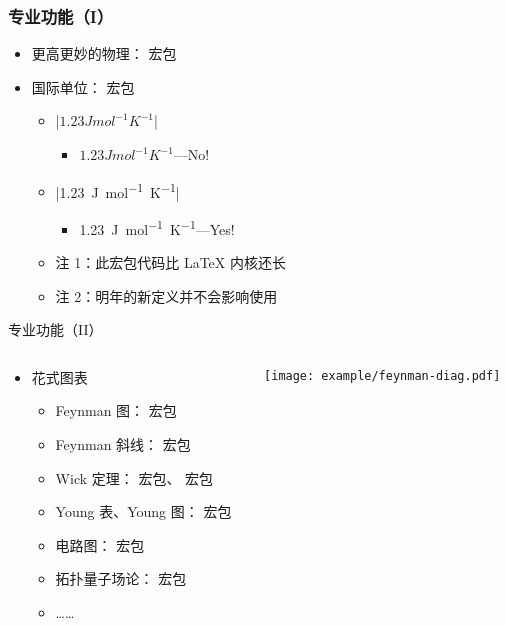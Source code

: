 \begin{frame}[fragile]
\frametitle{专业功能（I）}
\begin{itemize}
  \item 更高更妙的物理： 宏包
  \item 国际单位： 宏包
    \begin{itemize}
      \item |$1.23 J mol^{-1} K^{-1}$|
        \begin{itemize}
          \item $1.23 J mol^{-1} K^{-1}$---No!
        \end{itemize}
      \item |\SI{1.23}{J.mol^{-1}.K^{-1}}| 
        \begin{itemize}
          \item \SI{1.23}{J.mol^{-1}.K^{-1}}---Yes!
        \end{itemize}
      \item 注 1：此宏包代码比 \LaTeX{} 内核还长
      \item 注 2：明年的新定义并不会影响使用
    \end{itemize}
\end{itemize}
\end{frame}

\begin{frame}{专业功能（II）}
\begin{columns}
\begin{column}{0.65\textwidth}
  \begin{itemize}
    \item 花式图表
      \begin{itemize}
        \item Feynman 图： 宏包%
        \item Feynman 斜线： 宏包
        \item Wick 定理： 宏包、 宏包
        \item Young 表、Young 图： 宏包
        \item 电路图： 宏包
        \item 拓扑量子场论： 宏包
        \item ……
      \end{itemize}
  \end{itemize}
\end{column}
\begin{column}{0.3\textwidth}
  \hspace{-0.15\textwidth}
  \texttt{[image: example/feynman-diag.pdf]}
\end{column}
\end{columns}
\end{frame}
